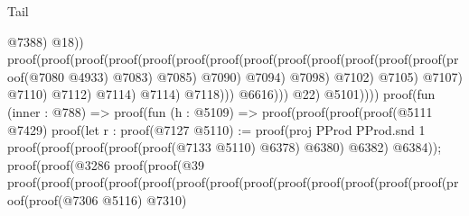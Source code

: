 \begin{lexlean}{Tail}
\begin{coremodule}
                                                                @7388)
                                                              @18))
                                                        proof(proof(proof(proof(proof(proof(proof(proof(proof(proof(proof(proof(proof(proof(@7080
                                                                                      @4933)
                                                                                    @7083)
                                                                                  @7085)
                                                                                @7090)
                                                                              @7094)
                                                                            @7098)
                                                                          @7102)
                                                                        @7105)
                                                                      @7107)
                                                                    @7110)
                                                                  @7112)
                                                                @7114)
                                                              @7114)
                                                            @7118)))
                                                  @6616)))
                                          @22)
                                        @5101))))
                              proof(fun (inner : @788) =>
                                proof(fun (h : @5109) =>
                                  proof(proof(proof(proof(@5111 @7429)
                                          proof(let r : proof(@7127
                                                @5110) := proof(proj PProd PProd.snd 1
                                              proof(proof(proof(proof(proof(@7133 @5110) @6378)
                                                      @6380)
                                                    @6382)
                                                  @6384));
                                            proof(proof(@3286
                                                  proof(proof(@39
                                                        proof(proof(proof(proof(proof(proof(proof(proof(proof(proof(proof(proof(proof(proof(proof(@7306
                                                                                        @5116)
                                                                                      @7310)

\end{coremodule}
\end{lexlean}
